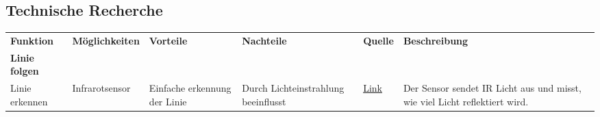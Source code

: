 \documentclass{article}
\begin{document}
\begin{landscape} %
	\section{Technische Recherche}
	\begin{longtable}{>{\raggedright\arraybackslash}p{3cm}>{\raggedright\arraybackslash}p{3cm}>{\raggedright\arraybackslash}p{5cm}>{\raggedright\arraybackslash}p{5cm}>{\raggedright\arraybackslash}p{1cm}>{\raggedright\arraybackslash}p{7cm}}		
		\textbf{Funktion}               & \textbf{Möglichkeiten} & \textbf{Vorteile}                                                                                & \textbf{Nachteile}                                                             & \textbf{Quelle}                                                                                              & \textbf{Beschreibung}                                                                                                                                                                                                                                                                                                                                                                                                                                                                     \\
		\textbf{Linie folgen}           &                         &                                                                                                  &                                                                                &                                                                                                              &                                                                                                                                                                                                                                                                                                                                                                                                                                                                                           \\
		Linie erkennen                  & Infrarotsensor          & Einfache erkennung der Linie                                                                     & Durch Lichteinstrahlung beeinflusst                                            & \href{https://www.futurelearn.com/info/courses/robotics-with-raspberry-pi/0/steps/75899}{Link}               & Der Sensor sendet IR Licht aus und misst, wie viel Licht reflektiert wird.                                                                                                                                                                                                                                                                                                                                                                                                                \\

\end{longtable}
\end{landscape}
\end{document}
